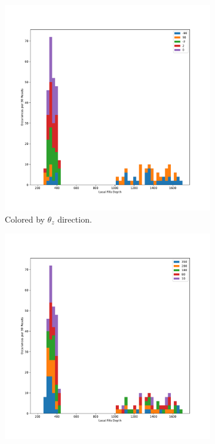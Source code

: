 \begin{figure}
\centering
\begin{subfigure}{.5\textwidth}
  \centering
  \includegraphics[width=\textwidth]{images/df_theta_cut.pdf}
  \caption{Colored by $\theta_{z}$ direction.}
\end{subfigure}%
\begin{subfigure}{.5\textwidth}
  \centering
  \includegraphics[width=\textwidth]{images/df_zpos_cut.pdf}

\end{subfigure}
\end{figure}
